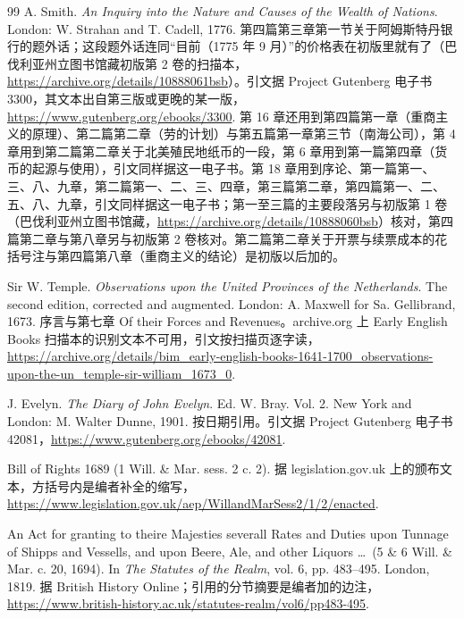 \begin{thebibliography}{99}
 A. Smith. \emph{An Inquiry into the Nature and Causes of the Wealth of Nations}. London: W. Strahan and T. Cadell, 1776. 第四篇第三章第一节关于阿姆斯特丹银行的题外话；这段题外话连同“目前（1775 年 9 月）”的价格表在初版里就有了（巴伐利亚州立图书馆藏初版第 2 卷的扫描本，\url{https://archive.org/details/10888061bsb}）。引文据 Project Gutenberg 电子书 3300，其文本出自第三版或更晚的某一版，\url{https://www.gutenberg.org/ebooks/3300}. 第 16 章还用到第四篇第一章（重商主义的原理）、第二篇第二章（劳的计划）与第五篇第一章第三节（南海公司），第 4 章用到第二篇第二章关于北美殖民地纸币的一段，第 6 章用到第一篇第四章（货币的起源与使用），引文同样据这一电子书。第 18 章用到序论、第一篇第一、三、八、九章，第二篇第一、二、三、四章，第三篇第二章，第四篇第一、二、五、八、九章，引文同样据这一电子书；第一至三篇的主要段落另与初版第 1 卷（巴伐利亚州立图书馆藏，\url{https://archive.org/details/10888060bsb}）核对，第四篇第二章与第八章另与初版第 2 卷核对。第二篇第二章关于开票与续票成本的花括号注与第四篇第八章（重商主义的结论）是初版以后加的。

 Sir W. Temple. \emph{Observations upon the United Provinces of the Netherlands}. The second edition, corrected and augmented. London: A. Maxwell for Sa. Gellibrand, 1673. 序言与第七章 Of their Forces and Revenues。archive.org 上 Early English Books 扫描本的识别文本不可用，引文按扫描页逐字读，\url{https://archive.org/details/bim_early-english-books-1641-1700_observations-upon-the-un_temple-sir-william_1673_0}.

 J. Evelyn. \emph{The Diary of John Evelyn}. Ed. W. Bray. Vol. 2. New York and London: M. Walter Dunne, 1901. 按日期引用。引文据 Project Gutenberg 电子书 42081，\url{https://www.gutenberg.org/ebooks/42081}.

 Bill of Rights 1689 (1 Will. \& Mar. sess. 2 c. 2). 据 legislation.gov.uk 上的颁布文本，方括号内是编者补全的缩写，\url{https://www.legislation.gov.uk/aep/WillandMarSess2/1/2/enacted}.

 An Act for granting to theire Majesties severall Rates and Duties upon Tunnage of Shipps and Vessells, and upon Beere, Ale, and other Liquors \ldots\ (5 \& 6 Will. \& Mar. c. 20, 1694). In \emph{The Statutes of the Realm}, vol. 6, pp. 483--495. London, 1819. 据 British History Online；引用的分节摘要是编者加的边注，\url{https://www.british-history.ac.uk/statutes-realm/vol6/pp483-495}.


\end{thebibliography}
